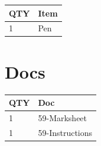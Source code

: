 \documentclass[10pt, A5]{article}
\begin{document}
\begin{framed}
\begin{minipage}{\textwidth}
\begin{multicols}{2}
\begin{center}
\begin{tabular}{p{2cm}p{4cm}}
				\textbf{QTY} & \textbf{Item} \\\toprule
												1&Pen\\\midrule
								\end{tabular}

			\end{center}

		
		\vfill\null
		\columnbreak

			\section*{\faFile \: Docs}
		 	\begin{center}
			\begin{tabular}{p{2cm}p{4cm}}

			\textbf{QTY} & \textbf{Doc} \\\toprule
										1&59-Marksheet\\\midrule
										1&59-Instructions\\\midrule
							\end{tabular}
			\end{center}
	

		\vfill\null

		\end{multicols}
\end{minipage}
\end{framed}
\end{document}
